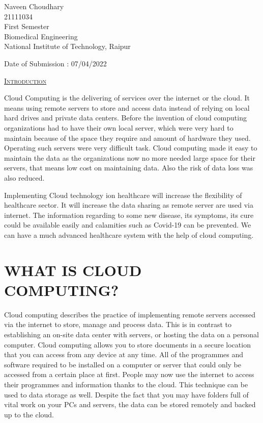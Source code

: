 \documentclass[12pt]{article}
\begin{document}
\begin{flushright}
Naveen Choudhary \\
21111034 \\
First Semester \\
Biomedical Engineering \\
National Institute of Technology, Raipur \\ 
\end{flushright}

\indent

\begin{flushleft}
Date of Submission : 07/04/2022
\end{flushleft}

\newpage
\pagestyle{fancy}
\begin{center}
    \textsc{\huge\underline{Introduction}}
\end{center}
 
 \indent
 
 
Cloud Computing is the delivering of services over the internet or the cloud. It means using remote servers to store and access data instead of relying on local hard drives and private data centers. Before the invention of cloud computing organizations had to have their own local server, which were very hard to maintain because of the space they require and amount of hardware they used. Operating such servers were very difficult task. Cloud computing made it easy to maintain the data as the organizations now no more needed large space for their servers, that means low cost on maintaining data. Also the risk of data loss was also reduced.

\indent

Implementing Cloud technology ion healthcare will increase the flexibility of healthcare sector. It will increase the data sharing as remote server are used via internet. The information regarding to some new disease, its symptoms, its cure could be available easily and calamities such as Covid-19 can be prevented.
We can have a much advanced healthcare system with the help of cloud computing.

\newpage

\section{WHAT IS CLOUD COMPUTING?}

Cloud computing describes the practice of implementing remote servers accessed via the internet to store, manage and process data. This is in contrast to establishing an on-site data center with servers, or hosting the data on a personal computer. Cloud computing allows you to store documents in a secure location that you can access from any device at any time. All of the programmes and software required to be installed on a computer or server that could only be accessed from a certain place at first. People may now use the internet to access their programmes and information thanks to the cloud. This technique can be used to data storage as well. Despite the fact that you may have folders full of vital work on your PCs and servers, the data can be stored remotely and backed up to the cloud.
\end{document}
